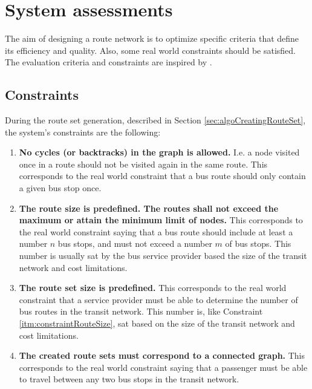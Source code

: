 \section{System assessments}
The aim of designing a route network is to optimize specific criteria that define its efficiency and quality. Also, some real world constraints should be satisfied. The evaluation criteria and constraints are inspired by \citep{kechagiopoulos14}.

\subsection{Constraints}
\label{sec:algoConstraints}
During the route set generation, described in Section \vref{sec:algoCreatingRouteSet}, the system's constraints are the following:
\begin{enumerate}
\item \label{itm:constraintCycles} \textbf{No cycles (or backtracks) in the graph is allowed.} I.e. a node visited once in a route should not be visited again in the same route.
This corresponds to the real world constraint that a bus route should only contain a given bus stop once. 
\item \label{itm:constraintRouteSize} \textbf{The route size is predefined. The routes shall not exceed the maximum or attain the minimum limit of nodes.}
This corresponds to the real world constraint saying that a bus route should include at least a number $n$ bus stops, and must not exceed a number $m$ of bus stops. This number is usually sat by the bus service provider based the size of the transit network and cost limitations. 
\item \label{itm:constraintRouteSetSize} \textbf{The route set size is predefined.}
This corresponds to the real world constraint that a service provider must be able to determine the number of bus routes in the transit network. This number is, like Constraint \ref{itm:constraintRouteSize}, sat based on the size of the transit network and cost limitations. 
\item \label{itm:criteriaConnectedGraph} \textbf{The created route sets must correspond to a connected graph.}
This corresponds to the real world constraint saying that a passenger must be able to travel between any two bus stops in the transit network. 
\end{enumerate}

